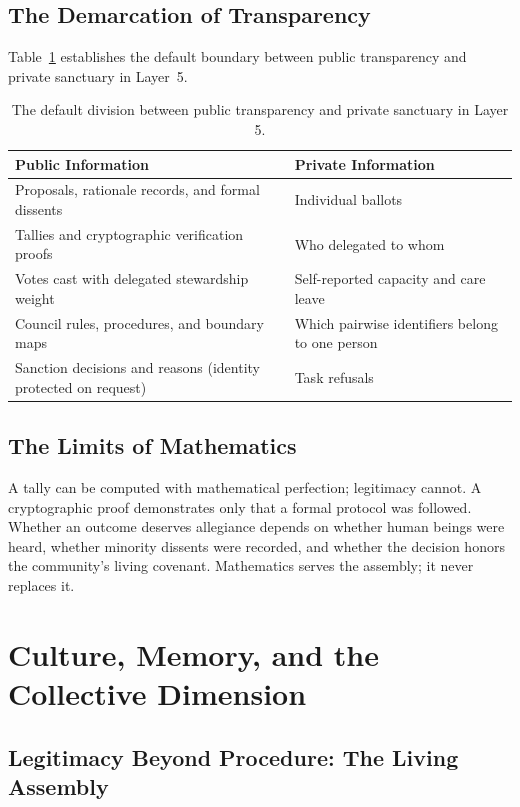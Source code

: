 \subsection{The Demarcation of Transparency}

Table~\ref{tab:l5-privacy} establishes the default boundary between public transparency and private sanctuary in Layer~5.

\begin{table}[htbp]
\centering
\small
\setlength{\tabcolsep}{4pt}
\begin{tabular}{|p{}|p{}|}
\hline
\textbf{Public Information} & \textbf{Private Information} \\
\hline
Proposals, rationale records, and formal dissents & Individual ballots \\
Tallies and cryptographic verification proofs & Who delegated to whom \\
Votes cast with delegated stewardship weight & Self-reported capacity and care leave \\
Council rules, procedures, and boundary maps & Which pairwise identifiers belong to one person \\
Sanction decisions and reasons (identity protected on request) & Task refusals \\
\hline
\end{tabular}
\caption{The default division between public transparency and private sanctuary in Layer 5.}
\label{tab:l5-privacy}
\end{table}

\subsection{The Limits of Mathematics}

A tally can be computed with mathematical perfection; legitimacy cannot. A cryptographic proof demonstrates only that a formal protocol was followed. Whether an outcome deserves allegiance depends on whether human beings were heard, whether minority dissents were recorded, and whether the decision honors the community's living covenant. Mathematics serves the assembly; it never replaces it.

\section{Culture, Memory, and the Collective Dimension}
\label{sec:l5-culture}

\subsection{Legitimacy Beyond Procedure: The Living Assembly}

